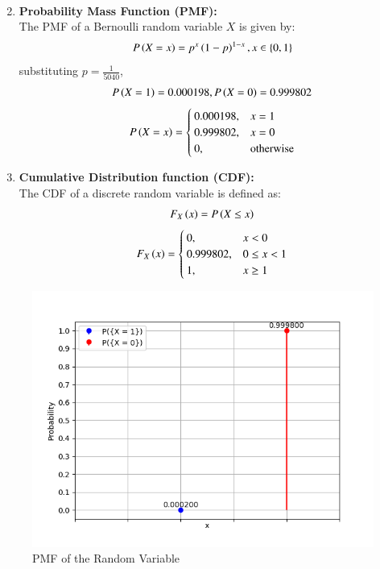 \documentclass[journal]{IEEEtran}
\numberwithin{equation}{enumi}
\numberwithin{figure}{enumi}
\begin{document}
\begin{enumerate}
\begin{align}
    \end{align}
    \item \textbf{Probability Mass Function (PMF):}\\
    The PMF  of a Bernoulli random variable $X$ is given by:
    \begin{align}
	P\left(X = x\right) = p^x\left(1 - p\right)^{1 - x}, x \in \left\{0,1\right\}
    \end{align}
    substituting $p = \frac{1}{5040}$,\\
    \begin{align}
     P\left(X = 1\right) = 0.000198, P\left(X = 0\right) = 0.999802
    \end{align}
    \begin{align}
    	P\left(X = x\right) = \begin{cases}
    		0.000198, & x = 1 \\
    		0.999802, & x = 0 \\
    		0, & \text{otherwise}
    	\end{cases}
    \end{align}

    \item \textbf{Cumulative Distribution function (CDF):}\\
    The CDF of a discrete random variable is defined as:\\
    \begin{align}
    	F_X\left(x\right) = P\left(X \leq x\right)
    \end{align}
    \begin{align}
            F_X\left(x\right) = \begin{cases}
                    0, & x < 0 \\
                    0.999802, & 0 \leq x < 1  \\
                    1, & x \geq 1
            \end{cases}
    \end{align}
\end{enumerate}

\begin{figure}
    \centering
    \includegraphics[width=0.5\linewidth]{figs/pmf.png}
    \caption{PMF of the Random Variable}
    \label{fig:enter-label}
\end{figure}
\end{document}

